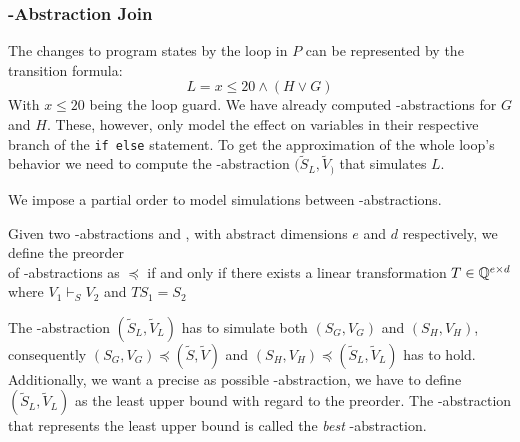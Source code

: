 \subsubsection{\qvasr-Abstraction Join}
The changes to program states by the loop in $P$ can be represented by the transition formula: 
\begin{equation*}
	L = x \leq 20 \land (H \lor G)
\end{equation*}
With $x \leq 20$ being the loop guard. We have already computed \qvasr-abstractions for $G$ and $H$. These, however, only model the effect on variables in their respective branch of the \texttt{if else} statement. To get the approximation of the whole loop's behavior we need to compute the \qvasr-abstraction $(\tilde{S}_L, \tilde{V}_)$ that simulates $L$. \\ \par We impose a partial order to model simulations between \qvasr-abstractions.
\begin{mydef}
	Given two \qvasr-abstractions   and , with abstract dimensions $e$ and $d$ respectively, we define the preorder \\ of \qvasr-abstractions as  $\preceq$  if and only if there exists a linear transformation $T \in  \mathbb{Q} ^{e \times d}$ where $V_1 \vdash_S V_2$ and $TS_1 = S_2$
\end{mydef}
The \qvasr-abstraction $(\tilde{S}_L, \tilde{V}_L)$ has to simulate both $(S_G, V_G)$ and $(S_H, V_H)$, consequently $(S_G, V_G) \preceq (\tilde{S}, \tilde{V})$ and $(S_H, V_H) \preceq (\tilde{S}_L, \tilde{V}_L)$ has to hold. Additionally, we want a precise as possible \qvasr-abstraction, we have to define $(\tilde{S}_L, \tilde{V}_L)$ as the least upper bound with regard to the preorder. The \qvasr-abstraction that represents the least upper bound is called the \textsl{best} \qvasr-abstraction. \\ \par

